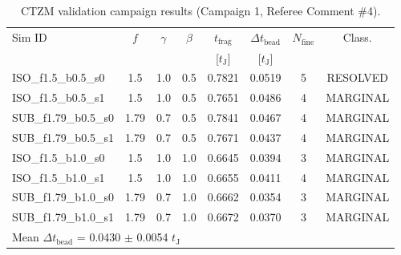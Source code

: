 \begin{table}
\centering
\caption{CTZM validation campaign results (Campaign 1, Referee Comment \#4).}
\label{tab:ctzm_validation}
\begin{tabular}{lccccccc}
\hline\hline
Sim ID & $f$ & $\gamma$ & $\beta$ & $t_\mathrm{frag}$ & $\Delta t_\mathrm{bead}$ & $N_\mathrm{fine}$ & Class. \\
 & & & & [$t_\mathrm{J}$] & [$t_\mathrm{J}$] & & \\
\hline
ISO\_f1.5\_b0.5\_s0 & 1.5 & 1.0 & 0.5 & 0.7821 & 0.0519 & 5 & RESOLVED \\
ISO\_f1.5\_b0.5\_s1 & 1.5 & 1.0 & 0.5 & 0.7651 & 0.0486 & 4 & MARGINAL \\
SUB\_f1.79\_b0.5\_s0 & 1.79 & 0.7 & 0.5 & 0.7841 & 0.0467 & 4 & MARGINAL \\
SUB\_f1.79\_b0.5\_s1 & 1.79 & 0.7 & 0.5 & 0.7671 & 0.0437 & 4 & MARGINAL \\
ISO\_f1.5\_b1.0\_s0 & 1.5 & 1.0 & 1.0 & 0.6645 & 0.0394 & 3 & MARGINAL \\
ISO\_f1.5\_b1.0\_s1 & 1.5 & 1.0 & 1.0 & 0.6655 & 0.0411 & 4 & MARGINAL \\
SUB\_f1.79\_b1.0\_s0 & 1.79 & 0.7 & 1.0 & 0.6662 & 0.0354 & 3 & MARGINAL \\
SUB\_f1.79\_b1.0\_s1 & 1.79 & 0.7 & 1.0 & 0.6672 & 0.0370 & 3 & MARGINAL \\
\hline
\multicolumn{8}{l}{Mean $\Delta t_\mathrm{bead}$ = 0.0430 $\pm$ 0.0054 $t_\mathrm{J}$} \\
\hline
\end{tabular}
\end{table}
